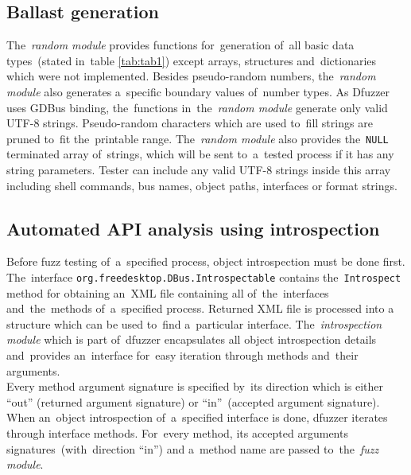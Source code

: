 \documentclass[conference]{IEEEtran}
\begin{document}
\subsection{Ballast generation}
The~\emph{random module} provides functions for~generation of~all basic data
types~(stated in~table \ref{tab:tab1}) except arrays, structures and~dictionaries
which were not implemented. Besides pseudo-random numbers, the~\emph{random module} also generates
a~specific boundary values of~number types.
As Dfuzzer uses GDBus binding, the~functions in~the~\emph{random module} generate
only valid UTF-8 strings. Pseudo-random characters which are used to~fill strings
are pruned to~fit the~printable range.
The~\emph{random module} also provides the~\texttt{NULL} terminated array of~strings,
which will be sent to~a~tested process if it has any string parameters. Tester
can include any valid UTF-8 strings inside this array including shell commands,
bus names, object paths, interfaces or format strings.\\

\subsection{Automated API analysis using introspection}
Before fuzz testing of~a~specified process, object introspection must be done
first. The~interface \texttt{org.freedesktop.DBus.Introspectable} contains
the~\texttt{Introspect} method for obtaining an~XML file containing all
of~the~interfaces and~the~methods of~a~specified process. Returned XML file is
processed into a structure which can be used to~find a~particular interface.
The~\emph{introspection module} which is part of~dfuzzer encapsulates all
object introspection details and~provides an~interface for~easy iteration
through methods and~their arguments.\\


Every method argument signature is specified by~its
direction which is either ``out'' (returned argument signature) or
``in''~(accepted argument signature). When an~object introspection of~a~specified
interface is done, dfuzzer iterates through interface methods. For~every method,
its accepted arguments signatures~(with~direction ``in'') and a~method name are
passed to~the~\emph{fuzz module}.
\end{document}

